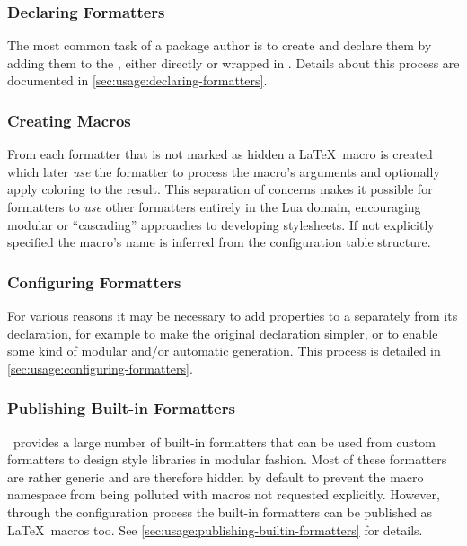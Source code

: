 \documentclass[12pt]{scrartcl}
\begin{document}
\subsubsection{Declaring Formatters}
\label{sec:intro-declaring-formatters}

The most common task of a package author is to create  and declare them by adding them to the , either directly or wrapped in .  Details about this process are documented in \vref{sec:usage:declaring-formatters}.


\subsubsection{Creating Macros}
\label{sec:intro-creating-macros}

From each formatter that is not marked as hidden a
\LaTeX\ macro is created which later \emph{use} the formatter to process the
macro's arguments and optionally apply coloring to the result. This separation
of concerns makes it possible for formatters to \emph{use} other formatters
entirely in the Lua domain, encouraging modular or “cascading” approaches to
developing stylesheets. If not explicitly specified the macro's name is inferred
from the configuration table structure.


\subsubsection{Configuring Formatters}
\label{sec:intro-configuring-formatters}

For various reasons it may be necessary to add properties to a  separately from its declaration, for example to make the original declaration simpler, or to enable some kind of modular and/or automatic generation.  This process is detailed in \vref{sec:usage:configuring-formatters}.


\subsubsection{Publishing Built-in Formatters}
\label{sec:intro-publishing-builtin-formatters}

\luatemplates\ provides a large number of built-in formatters that can be used from custom formatters to design style libraries in modular fashion.  Most of these formatters are rather generic and are therefore hidden by default to prevent the macro namespace from being polluted with macros not requested explicitly.  However, through the configuration process the built-in formatters can be published as \LaTeX\ macros too.  See \vref{sec:usage:publishing-builtin-formatters} for details.
\end{document}
